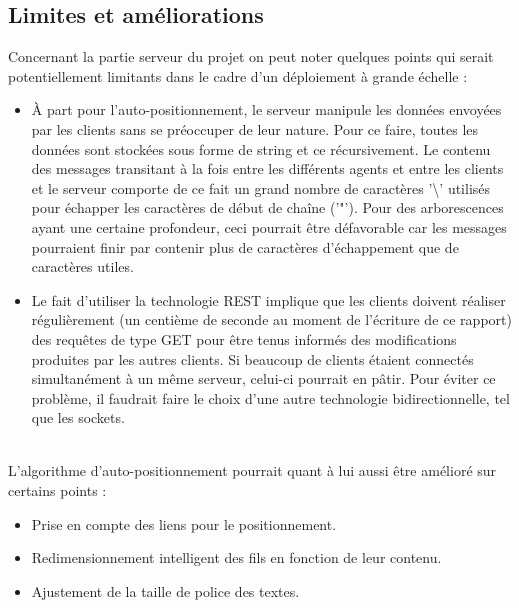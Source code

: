 \subsection{Limites et améliorations}
Concernant la partie serveur du projet on peut noter quelques points qui serait potentiellement limitants dans le cadre d'un déploiement à grande échelle :
\begin{itemize}
	\item
	À part pour l'auto-positionnement, le serveur manipule les données envoyées par les clients sans se préoccuper de leur nature.
	Pour ce faire, toutes les données sont stockées sous forme de string et ce récursivement.
	Le contenu des messages transitant à la fois entre les différents agents et entre les clients et le serveur comporte de ce fait un grand nombre de caractères '\textbackslash' utilisés pour échapper les caractères de début de chaîne ('"').
	Pour des arborescences ayant une certaine profondeur, ceci pourrait être défavorable car les messages pourraient finir par contenir plus de caractères d'échappement que de caractères utiles.
	\item
	Le fait d'utiliser la technologie REST implique que les clients doivent réaliser régulièrement (un centième de seconde au moment de l'écriture de ce rapport) des requêtes de type GET pour être tenus informés des modifications produites par les autres clients.
	Si beaucoup de clients étaient connectés simultanément à un même serveur, celui-ci pourrait en pâtir.
	Pour éviter ce problème, il faudrait faire le choix d'une autre technologie bidirectionnelle, tel que les sockets.
\end{itemize}
~\\
L'algorithme d'auto-positionnement pourrait quant à lui aussi être amélioré sur certains points :
\begin{itemize}
	\item Prise en compte des liens pour le positionnement.
	\item Redimensionnement intelligent des fils en fonction de leur contenu.
	\item Ajustement de la taille de police des textes.
\end{itemize}
